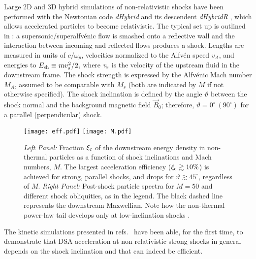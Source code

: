 \documentclass[varenna]{cimento}
\newcommand\thbn{\vartheta}
\renewcommand{\deg}{^{\circ}}
\newcommand{\xcr}{\xi_{\rm c}}
\newcommand{\esh}{E_{\rm sh}}
\begin{document}
Large 2D and 3D hybrid  simulations of non-relativistic shocks have been performed with the Newtonian code \emph{dHybrid} \cite{gargate+07} and its descendent \emph{dHybridR} \cite{haggerty+19a}, which allows accelerated particles to become relativistic.
The typical set up is outlined in \cite{caprioli+14a}: a supersonic/superalfv\'enic flow is smashed onto a reflective wall and the interaction between incoming and reflected flows produces a shock.
Lengths are measured in units of $c/\omega_p$, velocities normalized to the Alfv\'en speed $v_A$, and energies to $\esh\equiv m v_{\rm s}^2/2$, where $v_{\rm s}$ is the velocity of the upstream fluid in the downstream frame.
The shock strength is expressed by the Alfv\'enic Mach number $M_A$, assumed to be comparable with $M_{s}$ (both are indicated by $M$ if not otherwise specified).
The shock inclination is defined by the angle $\vartheta$ between the shock normal and the background magnetic field $\vec{B}_0$;
therefore, $\vartheta=0\deg~ (90\deg)$ for a parallel (perpendicular) shock.


\begin{figure}
\vspace{-0.0cm}
\centering
\texttt{[image: eff.pdf]}
\texttt{[image: M.pdf]}
\caption{\label{fig:eff}
\emph{Left Panel:} Fraction $\xcr$ of the downstream energy density in non-thermal particles as a function of shock inclinations and Mach numbers, $M$.
The largest acceleration efficiency ($\xcr\gtrsim 10\%$) is achieved for strong, parallel shocks, and drops for $\thbn\gtrsim 45\deg$, regardless of $M$.
\emph{Right Panel:} Post-shock particle spectra for $M=50$ and different shock obliquities, as in the legend.
The black dashed line represents the downstream Maxwellian.
Note how the non-thermal power-law tail develops only at low-inclination shocks  \cite{caprioli+14a}.
}
\vspace{-0.5cm}
\end{figure}
The kinetic simulations presented in refs.~\cite{caprioli+14a,caprioli+14b,caprioli+14c} have been able, for the first time, to demonstrate that DSA acceleration at non-relativistic strong shocks in general depends on the shock inclination and that can indeed be efficient.  
\end{document}
